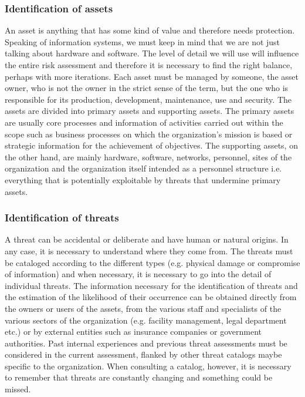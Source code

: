 \subsubsection{Identification of assets}
An asset is anything that has some kind of value and therefore needs protection. Speaking of information systems, we must keep in mind that we are not just talking about hardware and software. The level of detail we will use will influence the entire risk assessment and therefore it is necessary to find the right balance, perhaps with more iterations. Each asset must be managed by someone, the asset owner, who is not the owner in the strict sense of the term, but the one who is responsible for its production, development, maintenance, use and security. The assets are divided into primary assets and supporting assets. The primary assets are usually core processes and information of activities carried out within the scope such as business processes on which the organization's mission is based or strategic information for the achievement of objectives. The supporting assets, on the other hand, are mainly hardware, software, networks, personnel, sites of the organization and the organization itself intended as a personnel structure i.e. everything that is potentially exploitable by threats that undermine primary assets.
\subsubsection{Identification of threats}
A threat can be accidental or deliberate and have human or natural origins. In any case, it is necessary to understand where they come from. The threats must be cataloged according to the different types (e.g. physical damage or compromise of information) and when necessary, it is necessary to go into the detail of individual threats. The information necessary for the identification of threats and the estimation of the likelihood of their occurrence can be obtained directly from the owners or users of the assets, from the various staff and specialists of the various sectors of the organization (e.g. facility management, legal department etc.) or by external entities such as insurance companies or government authorities. Past internal experiences and previous threat assessments must be considered in the current assessment, flanked by other threat catalogs maybe specific to the organization. When consulting a catalog, however, it is necessary to remember that threats are constantly changing and something could be missed.


